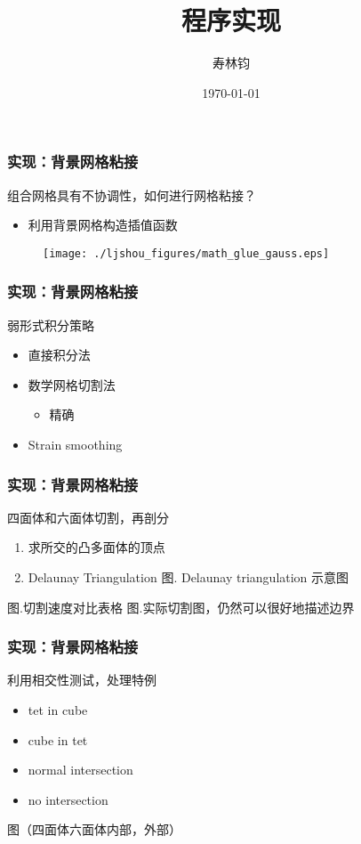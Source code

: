 \documentclass[mathserif]{beamer}
\begin{document}
\begin{CJK}{UTF8}{gkai}
	
\title{程序实现}
\author{寿林钧} 
\date{\today} 

\begin{frame}
	\titlepage
\end{frame}

\begin{frame}
	\frametitle{实现：背景网格粘接}
	组合网格具有不协调性，如何进行网格粘接？
		\begin{itemize}
			\item 利用背景网格构造插值函数
		\end{itemize}
		\begin{figure}
			\centering
			\texttt{[image: ./ljshou\_figures/math\_glue\_gauss.eps]}
		\end{figure}
\end{frame}

\begin{frame}
	\frametitle{实现：背景网格粘接}
	弱形式积分策略
	\begin{itemize}
		\item 直接积分法
		\item 数学网格切割法
		\begin{itemize}
			\item 精确
		\end{itemize}
		\item Strain smoothing
	\end{itemize}
\end{frame}

\begin{frame}
	\frametitle{实现：背景网格粘接}
	四面体和六面体切割，再剖分
	\begin{enumerate}
		\item 求所交的凸多面体的顶点
		\item Delaunay Triangulation
		图. Delaunay triangulation 示意图
	\end{enumerate}
	图.切割速度对比表格
	图.实际切割图，仍然可以很好地描述边界
\end{frame}

\begin{frame}
	\frametitle{实现：背景网格粘接}
	利用相交性测试，处理特例
	\begin{itemize}
		\item tet in cube
		\item cube in tet
		\item normal intersection
		\item no intersection
	\end{itemize}
	图（四面体六面体内部，外部）
\end{frame}


\end{CJK}
\end{document}
